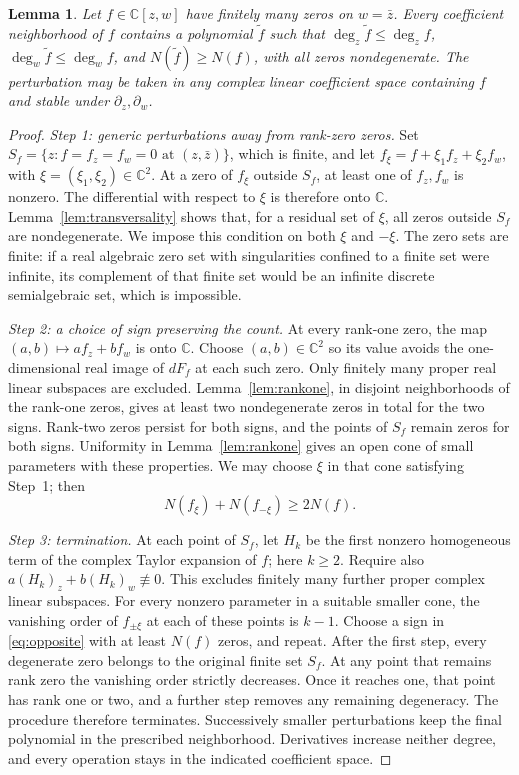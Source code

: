 \documentclass[a4paper]{amsart}
\newtheorem{lem}[thm]{Lemma}
\theoremstyle{remark}
\newcommand{\C}{\mathbb C}
\begin{document}
\begin{lem}\label{lem:regularization}
Let \(f\in\C[z,w]\) have finitely many zeros on \(w=\bar z\).
Every coefficient neighborhood of \(f\) contains a polynomial
\(\widetilde f\) such that
\(\deg_z\widetilde f\le\deg_z f\),
\(\deg_w\widetilde f\le\deg_w f\),
and \(N(\widetilde f)\ge N(f)\), with all zeros nondegenerate.
The perturbation may be taken in any complex linear coefficient
space containing \(f\) and stable under \(\partial_z,\partial_w\).
\end{lem}

\begin{proof}
\emph{Step 1: generic perturbations away from rank-zero zeros.}
Set \(S_f=\{z:f=f_z=f_w=0\text{ at }(z,\bar z)\}\), which is
finite, and let \(f_\xi=f+\xi_1f_z+\xi_2f_w\), with
\(\xi=(\xi_1,\xi_2)\in\C^2\).
At a zero of \(f_\xi\) outside \(S_f\), at least one of
\(f_z,f_w\) is nonzero. The differential with respect to \(\xi\)
is therefore onto \(\C\). Lemma~\ref{lem:transversality}
shows that, for a residual set of \(\xi\), all zeros outside
\(S_f\) are nondegenerate. We impose this condition on both
\(\xi\) and \(-\xi\). The zero sets are finite: if a real
algebraic zero set with singularities confined to a finite set
were infinite, its complement of that finite set would be an
infinite discrete semialgebraic set, which is impossible.

\emph{Step 2: a choice of sign preserving the count.}
At every rank-one zero, the map
\((a,b)\mapsto af_z+bf_w\) is onto \(\C\).
Choose \((a,b)\in\C^2\) so its value avoids the one-dimensional
real image of \(dF_f\) at each such zero.
Only finitely many proper real linear subspaces are excluded.
Lemma~\ref{lem:rankone}, in disjoint neighborhoods of the
rank-one zeros, gives at least two nondegenerate zeros in total
for the two signs. Rank-two zeros persist for both signs,
and the points of \(S_f\) remain zeros for both signs.
Uniformity in Lemma~\ref{lem:rankone} gives an open cone of
small parameters with these properties. We may choose \(\xi\)
in that cone satisfying Step~1; then
\begin{equation}\label{eq:opposite}
 N(f_\xi)+N(f_{-\xi})\ge2N(f).
\end{equation}

\emph{Step 3: termination.}
At each point of \(S_f\), let \(H_k\) be the first nonzero
homogeneous term of the complex Taylor expansion of \(f\);
here \(k\ge2\). Require also
\(a(H_k)_z+b(H_k)_w\not\equiv0\).
This excludes finitely many further proper complex linear
subspaces. For every nonzero parameter in a suitable smaller
cone, the vanishing order of \(f_{\pm\xi}\) at each of these
points is \(k-1\).
Choose a sign in \eqref{eq:opposite} with at least \(N(f)\)
zeros, and repeat. After the first step, every degenerate
zero belongs to the original finite set \(S_f\).
At any point that remains rank zero the vanishing order
strictly decreases. Once it reaches one, that point has rank
one or two, and a further step removes any remaining degeneracy.
The procedure therefore terminates.
Successively smaller perturbations keep the final polynomial
in the prescribed neighborhood. Derivatives increase neither
degree, and every operation stays in the indicated coefficient
space.
\end{proof}
\end{document}
